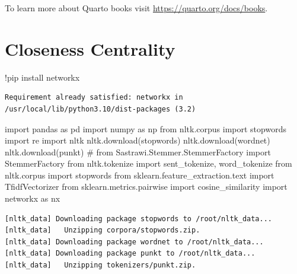 \documentclass[
  letterpaper,
]{krantz}
\makeatletter
\newenvironment{Shaded}{\begin{snugshade}}{\end{snugshade}}
\newcommand{\CommentTok}[1]{\textcolor[rgb]{0.37,0.37,0.37}{#1}}
\newcommand{\ImportTok}[1]{\textcolor[rgb]{0.00,0.46,0.62}{#1}}
\newcommand{\NormalTok}[1]{\textcolor[rgb]{0.00,0.23,0.31}{#1}}
\newcommand{\OperatorTok}[1]{\textcolor[rgb]{0.37,0.37,0.37}{#1}}
\newcommand{\StringTok}[1]{\textcolor[rgb]{0.13,0.47,0.30}{#1}}
\newenvironment{kframe}{%
\medskip{}
\setlength{\fboxsep}{.8em}
 \def\at@end@of@kframe{}%
 \ifinner\ifhmode%
  \def\at@end@of@kframe{\end{minipage}}%
  \begin{minipage}{\columnwidth}%
 \fi\fi%
 \def\FrameCommand##1{\hskip\@totalleftmargin \hskip-\fboxsep
 \colorbox{shadecolor}{##1}\hskip-\fboxsep
     \hskip-\linewidth \hskip-\@totalleftmargin \hskip\columnwidth}%
 \MakeFramed {\advance\hsize-\width
   \@totalleftmargin\z@ \linewidth\hsize
   \@setminipage}}%
 {\par\unskip\endMakeFramed%
 \at@end@of@kframe}
\renewenvironment{Shaded}{\begin{kframe}}{\end{kframe}}
\makeatother
\begin{document}
To learn more about Quarto books visit
\url{https://quarto.org/docs/books}.

\mainmatter


\hypertarget{closeness-centrality}{%
\chapter{Closeness Centrality}\label{closeness-centrality}}

\begin{Shaded}
\begin{Highlighting}[]
\OperatorTok{!}\NormalTok{pip install networkx}
\end{Highlighting}
\end{Shaded}

\begin{verbatim}
Requirement already satisfied: networkx in /usr/local/lib/python3.10/dist-packages (3.2)
\end{verbatim}

\begin{Shaded}
\begin{Highlighting}[]
\ImportTok{import}\NormalTok{ pandas }\ImportTok{as}\NormalTok{ pd}
\ImportTok{import}\NormalTok{ numpy }\ImportTok{as}\NormalTok{ np}
\ImportTok{from}\NormalTok{ nltk.corpus }\ImportTok{import}\NormalTok{ stopwords}
\ImportTok{import}\NormalTok{ re}
\ImportTok{import}\NormalTok{ nltk}
\NormalTok{nltk.download(}\StringTok{\textquotesingle{}stopwords\textquotesingle{}}\NormalTok{)}
\NormalTok{nltk.download(}\StringTok{\textquotesingle{}wordnet\textquotesingle{}}\NormalTok{)}
\NormalTok{nltk.download(}\StringTok{\textquotesingle{}punkt\textquotesingle{}}\NormalTok{)}
\CommentTok{\# from Sastrawi.Stemmer.StemmerFactory import StemmerFactory}
\ImportTok{from}\NormalTok{ nltk.tokenize }\ImportTok{import}\NormalTok{ sent\_tokenize, word\_tokenize}
\ImportTok{from}\NormalTok{ nltk.corpus }\ImportTok{import}\NormalTok{ stopwords}
\ImportTok{from}\NormalTok{ sklearn.feature\_extraction.text }\ImportTok{import}\NormalTok{ TfidfVectorizer}
\ImportTok{from}\NormalTok{ sklearn.metrics.pairwise }\ImportTok{import}\NormalTok{ cosine\_similarity}
\ImportTok{import}\NormalTok{ networkx }\ImportTok{as}\NormalTok{ nx}
\end{Highlighting}
\end{Shaded}

\begin{verbatim}
[nltk_data] Downloading package stopwords to /root/nltk_data...
[nltk_data]   Unzipping corpora/stopwords.zip.
[nltk_data] Downloading package wordnet to /root/nltk_data...
[nltk_data] Downloading package punkt to /root/nltk_data...
[nltk_data]   Unzipping tokenizers/punkt.zip.
\end{verbatim}
\end{document}
